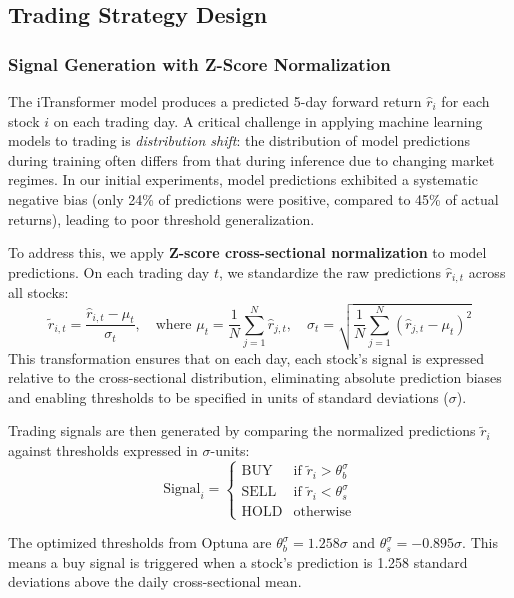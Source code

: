 \documentclass[12pt, a4paper]{article}
\begin{document}
\subsection{Trading Strategy Design} \label{sec:strategy}

\subsubsection{Signal Generation with Z-Score Normalization}

The iTransformer model produces a predicted 5-day forward return $\hat{r}_i$ for each stock $i$ on each trading day. A critical challenge in applying machine learning models to trading is \emph{distribution shift}: the distribution of model predictions during training often differs from that during inference due to changing market regimes. In our initial experiments, model predictions exhibited a systematic negative bias (only 24\% of predictions were positive, compared to 45\% of actual returns), leading to poor threshold generalization.

To address this, we apply \textbf{Z-score cross-sectional normalization} to model predictions. On each trading day $t$, we standardize the raw predictions $\hat{r}_{i,t}$ across all stocks:
\begin{equation}
\tilde{r}_{i,t} = \frac{\hat{r}_{i,t} - \mu_t}{\sigma_t}, \quad \text{where } \mu_t = \frac{1}{N}\sum_{j=1}^{N}\hat{r}_{j,t}, \quad \sigma_t = \sqrt{\frac{1}{N}\sum_{j=1}^{N}(\hat{r}_{j,t} - \mu_t)^2}
\end{equation}
This transformation ensures that on each day, each stock's signal is expressed relative to the cross-sectional distribution, eliminating absolute prediction biases and enabling thresholds to be specified in units of standard deviations ($\sigma$).

Trading signals are then generated by comparing the normalized predictions $\tilde{r}_i$ against thresholds expressed in $\sigma$-units:
\begin{equation}
\text{Signal}_i =
\begin{cases}
\text{BUY}  & \text{if } \tilde{r}_i > \theta_b^\sigma \\
\text{SELL} & \text{if } \tilde{r}_i < \theta_s^\sigma \\
\text{HOLD} & \text{otherwise}
\end{cases}
\end{equation}

The optimized thresholds from Optuna are $\theta_b^\sigma = 1.258\sigma$ and $\theta_s^\sigma = -0.895\sigma$. This means a buy signal is triggered when a stock's prediction is 1.258 standard deviations above the daily cross-sectional mean.
\end{document}
